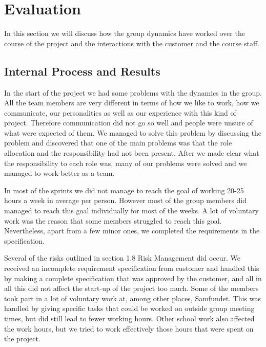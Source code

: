 \section{Evaluation}

In this section we will discuss how the group dynamics have worked over the course of the project and the interactions with the customer and the course staff. 

\subsection{Internal Process and Results}


	In the start of the project we had some problems with the dynamics in the group. 
	All the team members are very different in terms of how we like to work, how we communicate, 
	our personalities as well as our experience with this kind of project. Therefore communication 
	did not go so well and people were unsure of what were expected of them. We managed to solve 
	this problem by discussing the problem and discovered that one of the main problems was that 
	the role allocation and the responsibility had not been present. After we made clear what the 
	responsibility to each role was, many of our problems were solved and we managed to work better 
	as a team.

	In most of the sprints we did not manage to reach the goal of working 20-25 hours a week in 
	average per person. However most of the group members did managed to reach this goal individually 
	for most of the weeks. A lot of voluntary work was the reason that some members struggled to reach 
	this goal. Nevertheless, apart from a few minor ones, we completed the requirements in the specification.

	Several of the risks outlined in section 1.8 Risk Management did occur. We received an incomplete 
	requirement specification from customer and handled this by making a complete specification that 
	was approved by the customer, and all in all this did not affect the start-up of the project too much. 
	Some of the members took part in a lot of voluntary work at, among other places, Samfundet. This was handled 
	by giving specific tasks that could be worked on outside group meeting times, but did still lead to fewer 
	working hours. Other school work also affected the work hours, but we tried to work effectively those hours 
	that were spent on the project.

